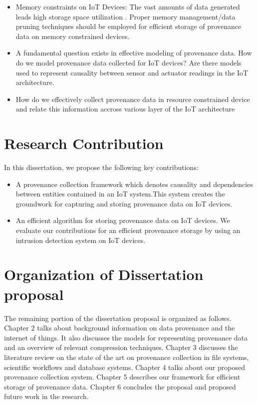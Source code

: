 \begin{itemize}

\item Memory constraints on IoT Devices: The vast amounts of data generated leads high storage space utilization . Proper memory management/data pruning techniques should be employed for efficient storage of provenance data on memory constrained devices. 

\item A fundamental question exists in effective modeling of provenance data. How do we model provenance data collected for IoT devices? Are there models used to represent causality between sensor and actuator readings in the IoT architecture.

\item How do we effectively collect provenance data in resource constrained device and relate this information accross various layer of the IoT architecture

\end{itemize}

\section{Research Contribution}

In this dissertation, we propose the following key contributions:

\begin{itemize}
  \item A provenance collection framework which denotes causality and dependencies between entities contained in an IoT system.This system creates the groundwork for capturing and storing provenance data  on IoT devices.
  \item An efficient algorithm for storing provenance data on IoT devices. We evaluate our contributions for an efficient provenance storage by using an intrusion detection system on IoT devices.
\end{itemize}

\section{Organization of Dissertation proposal}

The remaining portion of the dissertation proposal is organized as follows.  Chapter 2 talks about background information on data provenance and the internet of things. It also discusses the models for representing provenance data and an overview of relevant compression techniques. Chapter 3 discusses the literature review on the state of the art on provenance collection in file systems, scientific workflows and database systems. Chapter 4 talks about our proposed provenance collection system. Chapter 5 describes our framework for efficient storage of provenance data. Chapter 6 concludes the proposal and proposed future work in the research.

